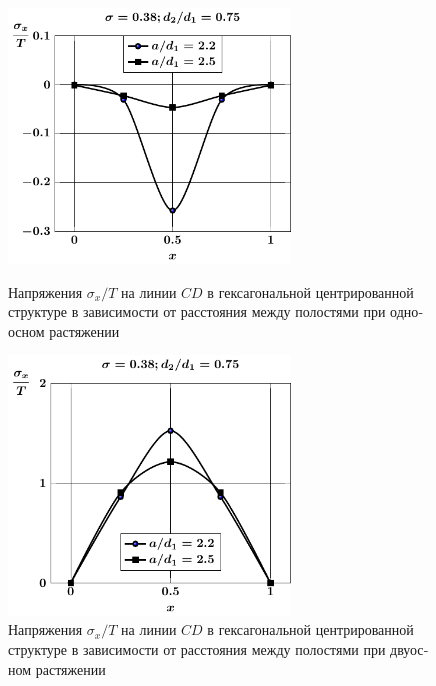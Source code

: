 \begin{russian}
\begin{figure}[h!]
\centering\footnotesize
\parbox[b]{7.5cm}{\centering\includegraphics[width=7.5cm]{cav13-a-d75-t1-sig_x-cd.pdf}
\caption{Напряжения $\sigma_x/T$ на линии $CD$ в гексагональной центрированной структуре в зависимости от расстояния между полостями при одноосном растяжении 
\label{f:9:50}}}\hfil\hfil
\parbox[b]{7.5cm}{\centering\includegraphics[width=7.5cm]{cav13-a-d75-t2-sig_x-cd.pdf}
\caption{Напряжения $\sigma_x/T$ на линии $CD$ в гексагональной центрированной структуре в зависимости от расстояния между полостями при двуосном растяжении
\label{f:9:51}}}
\end{figure}


\end{russian}
